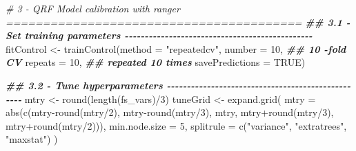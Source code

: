 \documentclass[
  10pt,
  b5paper,
  oneside]{book}
\newenvironment{Shaded}{\begin{snugshade}}{\end{snugshade}}
\newcommand{\AttributeTok}[1]{\textcolor[rgb]{0.77,0.63,0.00}{#1}}
\newcommand{\CommentTok}[1]{\textcolor[rgb]{0.56,0.35,0.01}{\textit{#1}}}
\newcommand{\ConstantTok}[1]{\textcolor[rgb]{0.00,0.00,0.00}{#1}}
\newcommand{\DecValTok}[1]{\textcolor[rgb]{0.00,0.00,0.81}{#1}}
\newcommand{\DocumentationTok}[1]{\textcolor[rgb]{0.56,0.35,0.01}{\textbf{\textit{#1}}}}
\newcommand{\FunctionTok}[1]{\textcolor[rgb]{0.00,0.00,0.00}{#1}}
\newcommand{\NormalTok}[1]{#1}
\newcommand{\OtherTok}[1]{\textcolor[rgb]{0.56,0.35,0.01}{#1}}
\newcommand{\SpecialCharTok}[1]{\textcolor[rgb]{0.00,0.00,0.00}{#1}}
\newcommand{\StringTok}[1]{\textcolor[rgb]{0.31,0.60,0.02}{#1}}
\begin{document}
\begin{Shaded}
\begin{Highlighting}[]
  \CommentTok{\# 3 {-} QRF Model calibration with ranger ========================================}
  \DocumentationTok{\#\# 3.1 {-} Set training parameters {-}{-}{-}{-}{-}{-}{-}{-}{-}{-}{-}{-}{-}{-}{-}{-}{-}{-}{-}{-}{-}{-}{-}{-}{-}{-}{-}{-}{-}{-}{-}{-}{-}{-}{-}{-}{-}{-}{-}{-}{-}{-}{-}{-}{-}{-}{-}}
\NormalTok{  fitControl }\OtherTok{\textless{}{-}} \FunctionTok{trainControl}\NormalTok{(}\AttributeTok{method =} \StringTok{"repeatedcv"}\NormalTok{,}
                             \AttributeTok{number =} \DecValTok{10}\NormalTok{,         }\DocumentationTok{\#\# 10 {-}fold CV}
                             \AttributeTok{repeats =} \DecValTok{10}\NormalTok{,        }\DocumentationTok{\#\# repeated 10 times}
                             \AttributeTok{savePredictions =} \ConstantTok{TRUE}\NormalTok{)}
  
  \DocumentationTok{\#\# 3.2 {-} Tune hyperparameters {-}{-}{-}{-}{-}{-}{-}{-}{-}{-}{-}{-}{-}{-}{-}{-}{-}{-}{-}{-}{-}{-}{-}{-}{-}{-}{-}{-}{-}{-}{-}{-}{-}{-}{-}{-}{-}{-}{-}{-}{-}{-}{-}{-}{-}{-}{-}{-}{-}{-}}
\NormalTok{  mtry }\OtherTok{\textless{}{-}} \FunctionTok{round}\NormalTok{(}\FunctionTok{length}\NormalTok{(fs\_vars)}\SpecialCharTok{/}\DecValTok{3}\NormalTok{)}
\NormalTok{  tuneGrid }\OtherTok{\textless{}{-}}  \FunctionTok{expand.grid}\NormalTok{(}
    \AttributeTok{mtry =} \FunctionTok{abs}\NormalTok{(}\FunctionTok{c}\NormalTok{(mtry}\SpecialCharTok{{-}}\FunctionTok{round}\NormalTok{(mtry}\SpecialCharTok{/}\DecValTok{2}\NormalTok{),}
\NormalTok{                 mtry}\SpecialCharTok{{-}}\FunctionTok{round}\NormalTok{(mtry}\SpecialCharTok{/}\DecValTok{3}\NormalTok{), }
\NormalTok{                 mtry, }
\NormalTok{                 mtry}\SpecialCharTok{+}\FunctionTok{round}\NormalTok{(mtry}\SpecialCharTok{/}\DecValTok{3}\NormalTok{),}
\NormalTok{                 mtry}\SpecialCharTok{+}\FunctionTok{round}\NormalTok{(mtry}\SpecialCharTok{/}\DecValTok{2}\NormalTok{))),}
    \AttributeTok{min.node.size =} \DecValTok{5}\NormalTok{,}
    \AttributeTok{splitrule =} \FunctionTok{c}\NormalTok{(}\StringTok{"variance"}\NormalTok{, }\StringTok{"extratrees"}\NormalTok{, }\StringTok{"maxstat"}\NormalTok{)}
\NormalTok{  )}
  

\end{Highlighting}
\end{Shaded}
\end{document}

